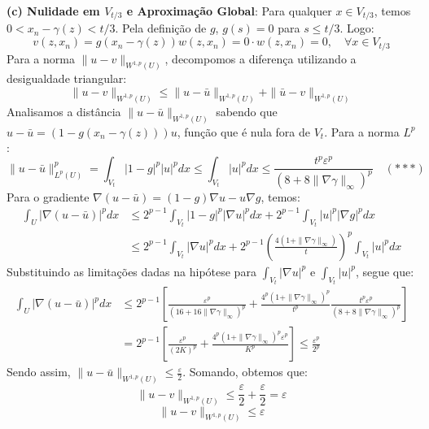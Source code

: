 \documentclass[cs_edp_2026.1.tex]{subfiles} %
\begin{document}
{	\textbf{(c) Nulidade em $V_{t/3}$ e Aproximação Global}:
	Para qualquer $x \in V_{t/3}$, temos $0 < x_n - \gamma(z) < t/3$. Pela definição de $g$, $g(s) = 0$ para $s \le t/3$. Logo:
	$$v(z, x_n) = g(x_n - \gamma(z)) w(z, x_n) = 0 \cdot w(z, x_n) = 0, \quad \forall x \in V_{t/3}$$
	Para a norma $\|u - v\|_{W^{1,p}(U)}$, decompomos a diferença utilizando a desigualdade triangular:
	$$\|u - v\|_{W^{1,p}(U)} \le \|u - \bar{u}\|_{W^{1,p}(U)} + \|\bar{u} - v\|_{W^{1,p}(U)}$$
	Analisamos a distância $\|u - \bar{u}\|_{W^{1,p}(U)}$ sabendo que $u - \bar{u} = (1 - g(x_n - \gamma(z))) u$, função que é nula fora de $V_t$. Para a norma $L^p$:
	$$\|u - \bar{u}\|_{L^p(U)}^p = \int_{V_t} |1-g|^p |u|^p dx \le \int_{V_t} |u|^p dx \le \frac{t^p \varepsilon^p}{(8 + 8\|\nabla \gamma\|_\infty)^p} \quad (\ast\ast\ast)$$
	Para o gradiente $\nabla(u - \bar{u}) = (1-g)\nabla u - u \nabla g$, temos:
	\begin{align*}
		\int_U |\nabla(u - \bar{u})|^p dx &\le 2^{p-1} \int_{V_t} |1-g|^p |\nabla u|^p dx + 2^{p-1} \int_{V_t} |u|^p |\nabla g|^p dx \\
		&\le 2^{p-1} \int_{V_t} |\nabla u|^p dx + 2^{p-1} \left( \frac{4(1 + \|\nabla \gamma\|_\infty)}{t} \right)^p \int_{V_t} |u|^p dx
	\end{align*}
	Substituindo as limitações dadas na hipótese para $\int_{V_t} |\nabla u|^p$ e $\int_{V_t} |u|^p$, segue que:
	\begin{align*}
		\int_U |\nabla(u - \bar{u})|^p dx &\le 2^{p-1} \left[ \frac{\varepsilon^p}{(16 + 16\|\nabla \gamma\|_\infty)^p} + \frac{4^p(1 + \|\nabla \gamma\|_\infty)^p}{t^p} \frac{t^p \varepsilon^p}{(8 + 8\|\nabla \gamma\|_\infty)^p} \right] \\
		&= 2^{p-1} \left[ \frac{\varepsilon^p}{(2K)^p} + \frac{4^p(1 + \|\nabla \gamma\|_\infty)^p \varepsilon^p}{K^p} \right] \le \frac{\varepsilon^p}{2^p}
	\end{align*}
	Sendo assim, $\|u - \bar{u}\|_{W^{1,p}(U)} \le \frac{\varepsilon}{2}$. Somando, obtemos que:
	$$\|u - v\|_{W^{1,p}(U)} \le \frac{\varepsilon}{2} + \frac{\varepsilon}{2} = \varepsilon$$
	$$\boxed{\|u - v\|_{W^{1,p}(U)} \le \varepsilon}$$
}


\end{document}
